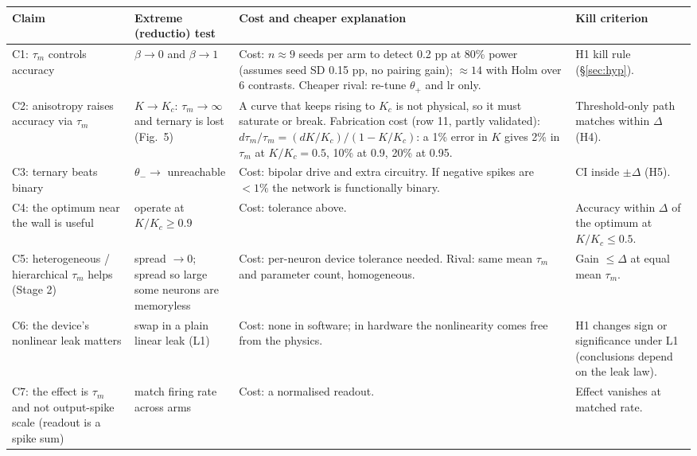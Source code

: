 \documentclass[10pt,a4paper]{article}
\newcommand{\taum}{\tau_m}
\newcommand{\ptn}{\Delta}
\begin{document}
\begin{center}\footnotesize
\begin{tabularx}{\textwidth}{@{}L{1.6cm}L{3.0cm}XL{3.3cm}@{}}
\toprule Claim & Extreme (reductio) test & Cost and cheaper explanation & Kill criterion\\ \midrule
C1: $\taum$ controls accuracy & $\beta\to0$ and $\beta\to1$ & Cost: $n\approx9$ seeds per arm to detect 0.2 pp at 80\% power (assumes seed SD 0.15 pp, no pairing gain); $\approx14$ with Holm over 6 contrasts. Cheaper rival: re-tune $\theta_+$ and lr only. & H1 kill rule (\S\ref{sec:hyp}).\\
C2: anisotropy raises accuracy via $\taum$ & $K\to K_c$: $\taum\to\infty$ and ternary is lost (Fig.~5) & A curve that keeps rising to $K_c$ is not physical, so it must saturate or break. Fabrication cost (row 11, partly validated): $d\taum/\taum=(dK/K_c)/(1-K/K_c)$: a 1\% error in $K$ gives 2\% in $\taum$ at $K/K_c=0.5$, 10\% at 0.9, 20\% at 0.95. & Threshold-only path matches within $\ptn$ (H4).\\
C3: ternary beats binary & $\theta_-\to$ unreachable & Cost: bipolar drive and extra circuitry. If negative spikes are $<1\%$ the network is functionally binary. & CI inside $\pm\ptn$ (H5).\\
C4: the optimum near the wall is useful & operate at $K/K_c\ge0.9$ & Cost: tolerance above. & Accuracy within $\ptn$ of the optimum at $K/K_c\le0.5$.\\
C5: heterogeneous / hierarchical $\taum$ helps (Stage 2) & spread $\to0$; spread so large some neurons are memoryless & Cost: per-neuron device tolerance needed. Rival: same mean $\taum$ and parameter count, homogeneous. & Gain $\le\ptn$ at equal mean $\taum$.\\
C6: the device's nonlinear leak matters & swap in a plain linear leak (L1) & Cost: none in software; in hardware the nonlinearity comes free from the physics. & H1 changes sign or significance under L1 (conclusions depend on the leak law).\\
C7: the effect is $\taum$ and not output-spike scale (readout is a spike sum) & match firing rate across arms & Cost: a normalised readout. & Effect vanishes at matched rate.\\
\bottomrule\end{tabularx}
\end{center}
\end{document}
